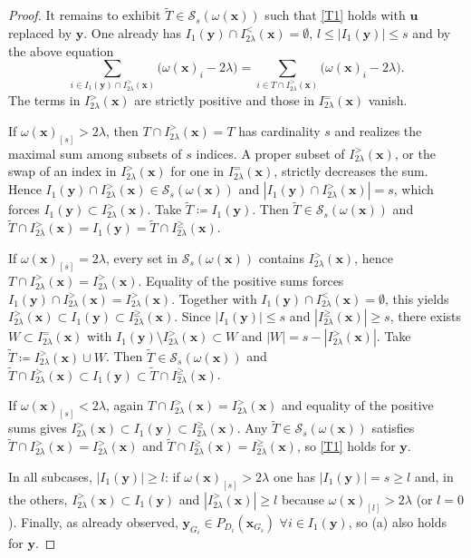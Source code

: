 \documentclass[11pt,a4paper]{article}
\theoremstyle{plain}
\theoremstyle{definition}
\theoremstyle{remark}
\newcommand*\x{\mathbf{x}}
\newcommand*\U{\mathbf{u}}
\newcommand*\y{\mathbf{y}}
\begin{document}
\begin{proof}
  It remains to exhibit \(\tilde{T}\in\mathcal{S}_{s}(\omega(\x))\) such that \eqref{T1} holds with \(\U\) replaced by \(\y\).
  One already has \(I_1(\y)\cap I_{2\lambda}^<(\x)=\emptyset\), \(l\leq |I_1(\y)|\leq s\) and by the above equation \[ \sum_{i\in I_1(\y)\cap I_{2\lambda}^>(\x)}\bigl(\omega(\x)_i-2\lambda\bigr)=\sum_{i\in T\cap I_{2\lambda}^>(\x)}\bigl(\omega(\x)_i-2\lambda\bigr).
  \]
  The terms in \(I_{2\lambda}^>(\x)\) are strictly positive and those in
  \(I_{2\lambda}^=(\x)\) vanish.

  If \(\omega(\x)_{[s]}>2\lambda\), then \(T\cap I_{2\lambda}^>(\x)=T\) has cardinality \(s\) and realizes the maximal sum among subsets of \(s\) indices.
  A proper subset of \(I_{2\lambda}^>(\x)\), or the swap of an index in \(I_{2\lambda}^>(\x)\) for one in \(I_{2\lambda}^=(\x)\), strictly decreases the sum.
  Hence \(I_1(\y)\cap I_{2\lambda}^>(\x)\in\mathcal{S}_{s}(\omega(\x))\) and \(|I_1(\y)\cap I_{2\lambda}^>(\x)|=s\), which forces \(I_1(\y)\subset I_{2\lambda}^>(\x)\).
  Take \(\tilde{T}\coloneqq I_1(\y)\).
  Then \(\tilde{T}\in\mathcal{S}_{s}(\omega(\x))\) and \(\tilde{T}\cap I_{2\lambda}^>(\x)=I_1(\y)=\tilde{T}\cap I_{2\lambda}^\geq(\x)\).

  If \(\omega(\x)_{[s]}=2\lambda\), every set in \(\mathcal{S}_{s}(\omega(\x))\) contains \(I_{2\lambda}^>(\x)\), hence \(T\cap I_{2\lambda}^>(\x)=I_{2\lambda}^>(\x)\).
  Equality of the positive sums forces \(I_1(\y)\cap I_{2\lambda}^>(\x)=I_{2\lambda}^>(\x)\).
  Together with \(I_1(\y)\cap I_{2\lambda}^<(\x)=\emptyset\), this yields \(I_{2\lambda}^>(\x)\subset I_1(\y)\subset I_{2\lambda}^\geq(\x)\).
  Since \(|I_1(\y)|\leq s\) and \(|I_{2\lambda}^\geq(\x)|\geq s\), there exists \(W\subset I_{2\lambda}^=(\x)\) with \(I_1(\y)\setminus I_{2\lambda}^>(\x)\subset W\) and \(|W|=s-|I_{2\lambda}^>(\x)|\).
  Take \(\tilde{T}\coloneqq I_{2\lambda}^>(\x)\cup W\).
  Then \(\tilde{T}\in\mathcal{S}_{s}(\omega(\x))\) and \(\tilde{T}\cap I_{2\lambda}^>(\x)\subset I_1(\y)\subset \tilde{T}\cap I_{2\lambda}^\geq(\x)\).

  If \(\omega(\x)_{[s]}<2\lambda\), again \(T\cap I_{2\lambda}^>(\x)=I_{2\lambda}^>(\x)\) and equality of the positive sums gives \(I_{2\lambda}^>(\x)\subset I_1(\y)\subset I_{2\lambda}^\geq(\x)\).
  Any \(\tilde{T}\in\mathcal{S}_{s}(\omega(\x))\) satisfies \(\tilde{T}\cap I_{2\lambda}^>(\x)=I_{2\lambda}^>(\x)\) and \(\tilde{T}\cap I_{2\lambda}^\geq(\x)=I_{2\lambda}^\geq(\x)\), so \eqref{T1} holds for \(\y\).

  In all subcases, \(|I_1(\y)|\geq l\): if \(\omega(\x)_{[s]}>2\lambda\) one has \(|I_1(\y)|=s\geq l\) and, in the others, \(I_{2\lambda}^>(\x)\subset I_1(\y)\) and \(|I_{2\lambda}^>(\x)|\geq l\) because \(\omega(\x)_{[l]}>2\lambda\) (or \(l=0\)).
  Finally, as already observed, \(\y_{G_i} \in P_{D_i}\left(\x_{G_i}\right)\) \(\forall i \in I_1(\y)\), so (a) also holds for \(\y\).


\end{proof}
\end{document}

